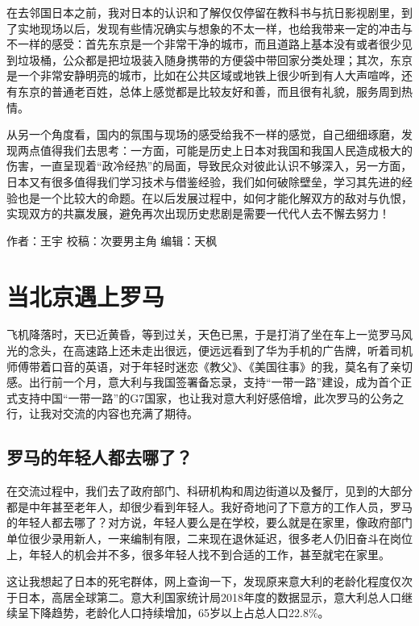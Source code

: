 \documentclass[]{book}
\begin{document}
在去邻国日本之前，我对日本的认识和了解仅仅停留在教科书与抗日影视剧里，到了实地现场以后，发现有些情况确实与想象的不太一样，也给我带来一定的冲击与不一样的感受：首先东京是一个非常干净的城市，而且道路上基本没有或者很少见到垃圾桶，公众都是把垃圾装入随身携带的方便袋中带回家分类处理；其次，东京是一个非常安静明亮的城市，比如在公共区域或地铁上很少听到有人大声喧哗，还有东京的普通老百姓，总体上感觉都是比较友好和善，而且很有礼貌，服务周到热情。

从另一个角度看，国内的氛围与现场的感受给我不一样的感觉，自己细细琢磨，发现两点值得我们去思考：一方面，可能是历史上日本对我国和我国人民造成极大的伤害，一直呈现着``政冷经热''的局面，导致民众对彼此认识不够深入，另一方面，日本又有很多值得我们学习技术与借鉴经验，我们如何破除壁垒，学习其先进的经验也是一个比较大的命题。在以后发展过程中，如何才能化解双方的敌对与仇恨，实现双方的共赢发展，避免再次出现历史悲剧是需要一代代人去不懈去努力！

作者：王宇
校稿：次要男主角
编辑：天枫

\hypertarget{ux5f53ux5317ux4eacux9047ux4e0aux7f57ux9a6c}{%
\section{当北京遇上罗马}\label{ux5f53ux5317ux4eacux9047ux4e0aux7f57ux9a6c}}

飞机降落时，天已近黄昏，等到过关，天色已黑，于是打消了坐在车上一览罗马风光的念头，在高速路上还未走出很远，便远远看到了华为手机的广告牌，听着司机师傅带着口音的英语，对于年轻时迷恋《教父》、《美国往事》的我，莫名有了亲切感。出行前一个月，意大利与我国签署备忘录，支持``一带一路''建设，成为首个正式支持中国``一带一路''的G7国家，也让我对意大利好感倍增，此次罗马的公务之行，让我对交流的内容也充满了期待。

\hypertarget{ux7f57ux9a6cux7684ux5e74ux8f7bux4ebaux90fdux53bbux54eaux4e86}{%
\subsection{罗马的年轻人都去哪了？}\label{ux7f57ux9a6cux7684ux5e74ux8f7bux4ebaux90fdux53bbux54eaux4e86}}

在交流过程中，我们去了政府部门、科研机构和周边街道以及餐厅，见到的大部分都是中年甚至老年人，却很少看到年轻人。我好奇地问了下意方的工作人员，罗马的年轻人都去哪了？对方说，年轻人要么是在学校，要么就是在家里，像政府部门单位很少录用新人，一来编制有限，二来现在退休延迟，很多老人仍旧奋斗在岗位上，年轻人的机会并不多，很多年轻人找不到合适的工作，甚至就宅在家里。

这让我想起了日本的死宅群体，网上查询一下，发现原来意大利的老龄化程度仅次于日本，高居全球第二。意大利国家统计局2018年度的数据显示，意大利总人口继续呈下降趋势，老龄化人口持续增加，65岁以上占总人口22.8\%。
\end{document}
